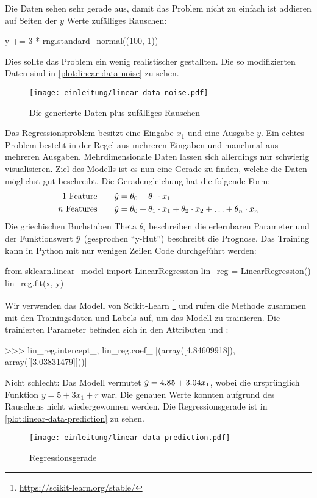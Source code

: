\noindent
Die Daten sehen sehr gerade aus, damit das Problem nicht zu einfach ist
addieren auf Seiten der $y$ Werte zufälliges Rauschen:
\begin{pythoncode}
y += 3 * rng.standard_normal((100, 1))
\end{pythoncode}
Dies sollte das Problem ein wenig realistischer gestallten.
Die so modifizierten Daten sind in \autoref{plot:linear-data-noise} zu sehen.
\newpage
\begin{figure}[!h]
  \centering
  \texttt{[image: einleitung/linear-data-noise.pdf]}
  \caption{Die generierte Daten plus zufälliges Rauschen}
  \label{plot:linear-data-noise}
\end{figure}
\noindent
Das Regressionsproblem besitzt eine Eingabe $x_1$ und eine Ausgabe $y$.
Ein echtes Problem besteht in der Regel aus mehreren Eingaben und manchmal
aus mehreren Ausgaben. Mehrdimensionale Daten lassen sich allerdings nur schwierig
visualisieren. Ziel des Modells ist es nun eine Gerade zu finden, welche die
Daten möglichst gut beschreibt. Die Geradengleichung hat die folgende Form:
\begin{align}
  \text{1 Feature}\qquad    & \hat{y} = \theta_0 + \theta_1 \cdot x_1   \\
  \text{$n$ Features}\qquad & \hat{y} = \theta_0 + \theta_1 \cdot x_1 +
  \theta_2 \cdot x_2 + \ldots + \theta_n \cdot x_n
\end{align}
Die griechischen Buchstaben Theta $\theta_i$ beschreiben die erlernbaren Parameter und
der Funktionswert $\hat{y}$ (gesprochen \enquote{y-Hut}) beschreibt die Prognose.
Das Training kann in Python mit nur wenigen Zeilen Code durchgeführt werden:
\begin{pythoncode}
from sklearn.linear_model import LinearRegression
lin_reg = LinearRegression()
lin_reg.fit(x, y)
\end{pythoncode}
Wir verwenden das  Modell von Scikit-Learn
\footnote{\url{https://scikit-learn.org/stable/}} und rufen die 
Methode zusammen mit den Trainingsdaten und Labels auf, um das Modell zu trainieren.
Die trainierten Parameter befinden sich in den Attributen 
und :
\begin{pythoncode}
>>> lin_reg.intercept_, lin_reg.coef_
|(array([4.84609918]), array([[3.03831479]]))|
\end{pythoncode}
Nicht schlecht: Das Modell vermutet $\hat{y} = 4.85 + 3.04x_1$, wobei die ursprünglich
Funktion $y = 5 + 3x_1 + r$ war. Die genauen Werte konnten aufgrund des Rauschens
nicht wiedergewonnen werden. Die Regressionsgerade ist
in \autoref{plot:linear-data-prediction} zu sehen.
\begin{figure}[!h]
  \centering
  \texttt{[image: einleitung/linear-data-prediction.pdf]}
  \caption{Regressionsgerade}
  \label{plot:linear-data-prediction}
\end{figure}

